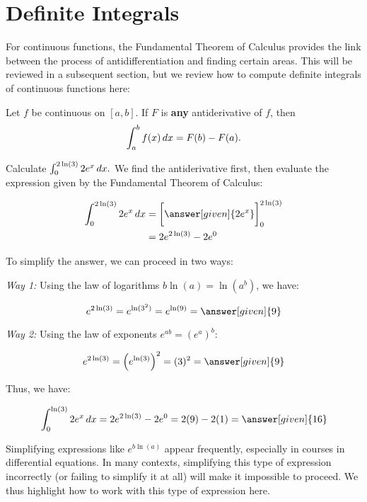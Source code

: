 \documentclass[nooutcomes]{ximera}
\begin{document}

\section{Definite Integrals}
For continuous functions, the Fundamental Theorem of Calculus provides the link between the process of antidifferentiation and finding certain areas.  This will be reviewed in a subsequent section, but we review how to compute definite integrals of continuous functions here:

\begin{theorem}
  Let $f$ be continuous on $[a,b]$. If $F$ is \textbf{any}
  antiderivative of $f$, then
  \[
  \int_a^b f(x)\mathop{}\!d x = F(b)-F(a).
  \]
\end{theorem}

\begin{example}
Calculate $\int_0^{2\ln(3)} 2e^x \mathop{}\!d x.$  We find the antiderivative first, then evaluate the expression given by the Fundamental Theorem of Calculus:

\begin{align*}
\int_0^{2\ln(3)} 2e^x \d x &= \eval{\answer[given]{2e^x}}_0^{2\ln(3)} \\
&= 2e^{2\ln(3)}-2e^0 \\
\end{align*}

To simplify the answer, we can proceed in two ways:

\emph{Way 1:} Using the law of logarithms $b \ln(a) = \ln(a^b)$, we have:

\[
e^{2\ln(3)} = e^{\ln(3^2)} = e^{\ln(9)} = \answer[given]{9}
\]

\emph{Way 2:} Using the law of exponents $e^{ab} = \left(e^a\right)^b$:

\[
e^{2\ln(3)} = \left(e^{\ln(3)}\right)^2 = (3)^2 = \answer[given]{9}
\]

Thus, we have:

\[
\int_0^{\ln(3)} 2e^x \d x = 2e^{2\ln(3)}-2e^0 = 2(9)-2(1) = \answer[given]{16}
\]

\begin{remark}
Simplifying expressions like $e^{b \ln(a)}$ appear frequently, especially in courses in differential equations.  In many contexts, simplifying this type of expression incorrectly (or failing to simplify it at all) will make it impossible to proceed.  We thus highlight how to work with this type of expression here.
\end{remark}
\end{example}
\end{document}
